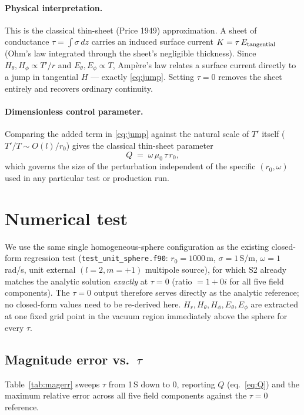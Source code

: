 \documentclass[11pt]{article}
\begin{document}
\paragraph{Physical interpretation.} This is the classical thin-sheet (Price 1949) approximation. A
sheet of conductance $\tau=\int\sigma\,dz$ carries an induced surface current $K=\tau\,E_{\rm
tangential}$ (Ohm's law integrated through the sheet's negligible thickness). Since $H_\theta,H_\phi
\propto T'/r$ and $E_\theta,E_\phi\propto T$, Amp\`ere's law relates a surface current directly to a
jump in tangential $H$ --- exactly \eqref{eq:jump}. Setting $\tau=0$ removes the sheet entirely and
recovers ordinary continuity.

\paragraph{Dimensionless control parameter.} Comparing the added term in \eqref{eq:jump} against the
natural scale of $T'$ itself ($T'/T\sim O(l)/r_0$) gives the classical thin-sheet parameter
\begin{equation}
  Q \;=\; \omega\,\mu_0\,\tau\,r_0 ,
  \label{eq:Q}
\end{equation}
which governs the size of the perturbation independent of the specific $(r_0,\omega)$ used in any
particular test or production run.

\section{Numerical test}

We use the same single homogeneous-sphere configuration as the existing closed-form regression test
(\texttt{test\_unit\_sphere.f90}: $r_0=1000$\,m, $\sigma=1$\,S/m, $\omega=1$\,rad/s, unit external
$(l{=}2,m{=}{+}1)$ multipole source), for which S2 already matches the analytic solution
\emph{exactly} at $\tau=0$ (ratio $=1+0i$ for all five field components). The $\tau=0$ output
therefore serves directly as the analytic reference; no closed-form values need to be re-derived here.
$H_r,H_\theta,H_\phi,E_\theta,E_\phi$ are extracted at one fixed grid point in the vacuum region
immediately above the sphere for every $\tau$.

\subsection{Magnitude error vs.\ $\tau$}

Table~\ref{tab:magerr} sweeps $\tau$ from 1\,S down to 0, reporting $Q$ (eq.~\ref{eq:Q}) and the
maximum relative error across all five field components against the $\tau=0$ reference.
\end{document}
